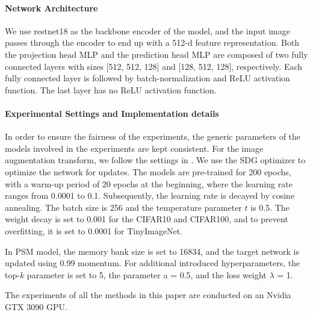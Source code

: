 \documentclass[review]{elsarticle}
\begin{document}
\paragraph{Network Architecture}
We use restnet18\cite{b29} as the backbone encoder of the model, and the input image passes through the encoder to end up with a 512-d feature representation. Both the projection head MLP and the prediction head MLP are composed of two fully connected layers with sizes [512, 512, 128] and [128, 512, 128], respectively. Each fully connected layer is followed by batch-normalization \cite{b30} and ReLU activation function. The last layer has no ReLU activation function.


\paragraph{Experimental Settings and Implementation details}
In order to ensure the fairness of the experiments, the generic parameters of the models involved in the experiments are kept consistent. For the image augmentation transform, we follow the settings in \cite{b3,b5}. We use the SDG optimizer to optimize the network for updates. The models are pre-trained for 200 epochs, with a warm-up period of 20 epochs at the beginning, where the learning rate ranges from 0.0001 to 0.1. Subsequently, the learning rate is decayed by cosine annealing. The batch size is 256 and the temperature parameter $t$ is 0.5. The weight decay is set to 0.001 for the CIFAR10 and CIFAR100, and to prevent overfitting, it is set to 0.0001 for TinyImageNet.

In PSM model, the memory bank size is set to 16834, and the target network is updated using 0.99 momentum. For additional introduced hyperparameters, the top-$k$ parameter is set to 5, the parameter a = 0.5, and the loss weight $\lambda $ = 1.

The experiments of all the methods in this paper are conducted on an Nvidia GTX 3090 GPU.
\end{document}
